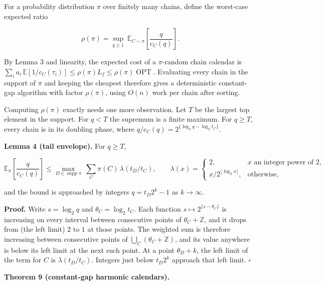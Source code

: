\documentclass[
  british,
  11pt,
  a4paper,
]{article}
\begin{document}
For a probability distribution \(\pi\) over finitely many chains, define
the worst-case expected ratio

\[
\rho(\pi)=\sup_{q\ge1}\ \mathbb E_{C\sim\pi}\left[\frac q{c_C(q)}\right]. \tag{33}
\]

By Lemma 3 and linearity, the expected cost of a \(\pi\)-random chain
calendar is
\(\sum_ia_i\,\mathbb E[1/c_C(\tau_i)]\le\rho(\pi)L_f\le\rho(\pi)\operatorname{OPT}\).
Evaluating every chain in the support of \(\pi\) and keeping the
cheapest therefore gives a deterministic constant-gap algorithm with
factor \(\rho(\pi)\), using \(O(n)\) work per chain after sorting.

Computing \(\rho(\pi)\) exactly needs one more observation. Let \(T\) be
the largest top element in the support. For \(q<T\) the supremum is a
finite maximum. For \(q\ge T\), every chain is in its doubling phase,
where \(q/c_C(q)=2^{\{\log_2q-\log_2t_C\}}\).

\textbf{Lemma 4 (tail envelope).} For \(q\ge T\),

\[
\mathbb E_\pi\left[\frac q{c_C(q)}\right]\le\max_{D\in\operatorname{supp}\pi}\ \sum_{C}\pi(C)\,\lambda(t_D/t_C),\qquad
\lambda(x)=\begin{cases}2,&x\text{ an integer power of }2,\\ x/2^{\lfloor\log_2x\rfloor},&\text{otherwise,}\end{cases} \tag{34}
\]

and the bound is approached by integers \(q=t_D2^k-1\) as
\(k\to\infty\).

\textbf{Proof.} Write \(s=\log_2q\) and \(\theta_C=\log_2t_C\). Each
function \(s\mapsto2^{\{s-\theta_C\}}\) is increasing on every interval
between consecutive points of \(\theta_C+\mathbb Z\), and it drops from
(the left limit) \(2\) to \(1\) at those points. The weighted sum is
therefore increasing between consecutive points of
\(\bigcup_C(\theta_C+\mathbb Z)\), and its value anywhere is below its
left limit at the next such point. At a point \(\theta_D+k\), the left
limit of the term for \(C\) is \(\lambda(t_D/t_C)\). Integers just below
\(t_D2^k\) approach that left limit. \(\square\)

\textbf{Theorem 9 (constant-gap harmonic calendars).}
\end{document}
